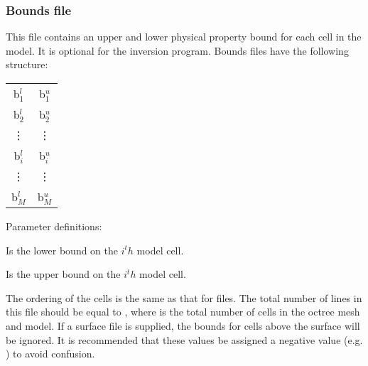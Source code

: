 \subsubsection{Bounds file}

This file contains an upper and lower physical property bound for each cell in the model. It is optional for the inversion program. Bounds files have the following structure:
%
\begin{fileExample}
\begin{tabular}{|cc|}
\hline
b$^l_{1}$ & b$^u_{1}$\\
b$^l_{2}$ & b$^u_{2}$\\
\vdots & \vdots \\
b$^l_{i}$ & b$^u_{i}$\\
\vdots & \vdots \\
b$^l_{M}$ & b$^u_{M}$\\
\hline
\end{tabular}
\end{fileExample}

Parameter definitions:
\begin{description}[leftmargin=5cm, style=sameline, align=left]
\item[\codeName{{b}$^l_{i}$}] Is the lower bound on the $i^th$ model cell.
\item[\codeName{{b}$^u_{i}$}] Is the upper bound on the $i^th$ model cell.
\end{description}

The ordering of the cells is the same as that for  files. The total number of lines in this file should be equal to , where  is the total number of cells in the octree mesh and model. If a surface  file is supplied, the bounds for cells above the surface will be ignored. It is recommended that these values be assigned a negative value (e.g. ) to avoid confusion.